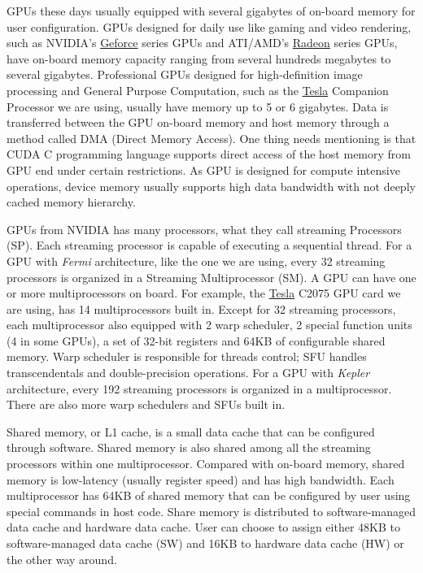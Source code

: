 \documentclass[letterpaper,10pt,openany,oneside]{sphinxmanual}
\begin{document}
GPUs these days usually equipped with several gigabytes of on-board memory for user configuration. GPUs designed for daily use like gaming and video rendering, such as NVIDIA's \href{http://www.nvidia.com/object/geforce\_family.html}{Geforce} series GPUs and ATI/AMD's \href{http://www.amd.com/us/products/desktop/graphics/pages/desktop-graphics.aspx}{Radeon} series GPUs, have on-board memory capacity ranging from several hundreds megabytes to several gigabytes. Professional GPUs designed for high-definition image processing and General Purpose Computation, such as the \href{http://www.nvidia.com/object/tesla-supercomputing-solutions.html}{Tesla} Companion Processor we are using, usually have memory up to 5 or 6 gigabytes. Data is transferred between the GPU on-board memory and host memory through a method called DMA (Direct Memory Access). One thing needs mentioning is that CUDA C programming language supports direct access of the host memory from GPU end under certain restrictions. As GPU is designed for compute intensive operations, device memory usually supports high data bandwidth with not deeply cached memory hierarchy.

GPUs from NVIDIA has many processors, what they call streaming Processors (SP). Each streaming processor is capable of executing a sequential thread. For a GPU with \emph{Fermi} architecture, like the one we are using, every 32 streaming processors is organized in a Streaming Multiprocessor (SM). A GPU can have one or more multiprocessors on board. For example, the \href{http://www.nvidia.com/object/tesla-supercomputing-solutions.html}{Tesla} C2075 GPU card we are using, has 14 multiprocessors built in. Except for 32 streaming processors, each multiprocessor also equipped with 2 warp scheduler, 2 special function units (4 in some GPUs), a set of 32-bit registers and 64KB of configurable shared memory. Warp scheduler is responsible for threads control; SFU handles transcendentals and double-precision operations. For a GPU with \emph{Kepler} architecture, every 192 streaming processors is organized in a multiprocessor. There are also more warp schedulers and SFUs built in.

Shared memory, or L1 cache, is a small data cache that can be configured through software. Shared memory is also shared among all the streaming processors within one multiprocessor. Compared with on-board memory, shared memory is low-latency (usually register speed) and has high bandwidth. Each multiprocessor has 64KB of shared memory that can be configured by user using special commands in host code. Share memory is distributed to software-managed data cache and hardware data cache. User can choose to assign either 48KB to software-managed data cache (SW) and 16KB to hardware data cache (HW) or the other way around.
\end{document}
